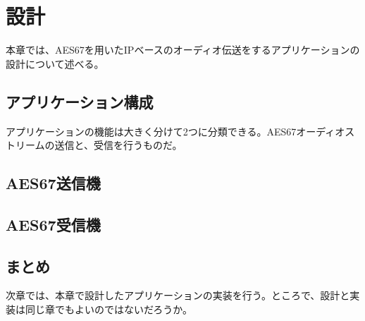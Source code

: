 \chapter{設計}
\label{chap:design}

本章では、AES67を用いたIPベースのオーディオ伝送をするアプリケーションの設計について述べる。

\section{アプリケーション構成}

アプリケーションの機能は大きく分けて2つに分類できる。AES67オーディオストリームの送信と、受信を行うものだ。

\section{AES67送信機}

\section{AES67受信機}

\section{まとめ}

次章では、本章で設計したアプリケーションの実装を行う。ところで、設計と実装は同じ章でもよいのではないだろうか。
